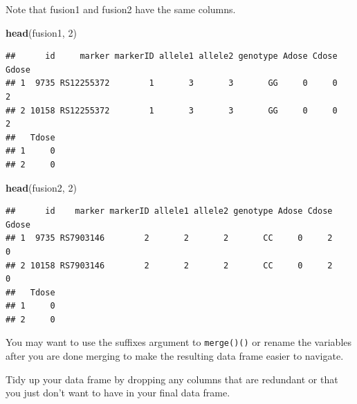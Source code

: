 \documentclass[]{book}
\newenvironment{Shaded}{\begin{snugshade}}{\end{snugshade}}
\newcommand{\DecValTok}[1]{\textcolor[rgb]{0.00,0.00,0.81}{#1}}
\newcommand{\KeywordTok}[1]{\textcolor[rgb]{0.13,0.29,0.53}{\textbf{#1}}}
\newcommand{\NormalTok}[1]{#1}
\begin{document}
Note that {fusion1} and {fusion2} have the same columns.

\begin{Shaded}
\begin{Highlighting}[]
\KeywordTok{head}\NormalTok{(fusion1, }\DecValTok{2}\NormalTok{)}
\end{Highlighting}
\end{Shaded}

\begin{verbatim}
##      id     marker markerID allele1 allele2 genotype Adose Cdose Gdose
## 1  9735 RS12255372        1       3       3       GG     0     0     2
## 2 10158 RS12255372        1       3       3       GG     0     0     2
##   Tdose
## 1     0
## 2     0
\end{verbatim}

\begin{Shaded}
\begin{Highlighting}[]
\KeywordTok{head}\NormalTok{(fusion2, }\DecValTok{2}\NormalTok{)}
\end{Highlighting}
\end{Shaded}

\begin{verbatim}
##      id    marker markerID allele1 allele2 genotype Adose Cdose Gdose
## 1  9735 RS7903146        2       2       2       CC     0     2     0
## 2 10158 RS7903146        2       2       2       CC     0     2     0
##   Tdose
## 1     0
## 2     0
\end{verbatim}

You may want to use the {suffixes} argument to \texttt{merge()()} or rename the variables
after you are done merging to make the resulting data frame easier to navigate.

Tidy up your data frame by dropping any columns that are redundant or that you just don't want to
have in your final data frame.

\shipoutProblems
\end{document}
